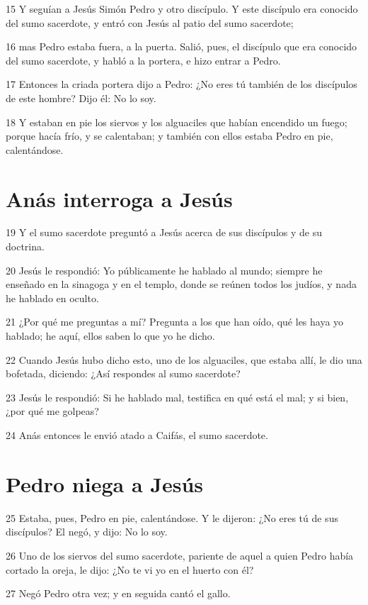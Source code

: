 \par 15 Y seguían a Jesús Simón Pedro y otro discípulo. Y este discípulo era conocido del sumo sacerdote, y entró con Jesús al patio del sumo sacerdote;
\par 16 mas Pedro estaba fuera, a la puerta. Salió, pues, el discípulo que era conocido del sumo sacerdote, y habló a la portera, e hizo entrar a Pedro.
\par 17 Entonces la criada portera dijo a Pedro: ¿No eres tú también de los discípulos de este hombre? Dijo él: No lo soy.
\par 18 Y estaban en pie los siervos y los alguaciles que habían encendido un fuego; porque hacía frío, y se calentaban; y también con ellos estaba Pedro en pie, calentándose.

\section*{Anás interroga a Jesús}

\par 19 Y el sumo sacerdote preguntó a Jesús acerca de sus discípulos y de su doctrina.
\par 20 Jesús le respondió: Yo públicamente he hablado al mundo; siempre he enseñado en la sinagoga y en el templo, donde se reúnen todos los judíos, y nada he hablado en oculto.
\par 21 ¿Por qué me preguntas a mí? Pregunta a los que han oído, qué les haya yo hablado; he aquí, ellos saben lo que yo he dicho.
\par 22 Cuando Jesús hubo dicho esto, uno de los alguaciles, que estaba allí, le dio una bofetada, diciendo: ¿Así respondes al sumo sacerdote?
\par 23 Jesús le respondió: Si he hablado mal, testifica en qué está el mal; y si bien, ¿por qué me golpeas?
\par 24 Anás entonces le envió atado a Caifás, el sumo sacerdote.

\section*{Pedro niega a Jesús}

\par 25 Estaba, pues, Pedro en pie, calentándose. Y le dijeron: ¿No eres tú de sus discípulos? El negó, y dijo: No lo soy.
\par 26 Uno de los siervos del sumo sacerdote, pariente de aquel a quien Pedro había cortado la oreja, le dijo: ¿No te vi yo en el huerto con él?
\par 27 Negó Pedro otra vez; y en seguida cantó el gallo.

